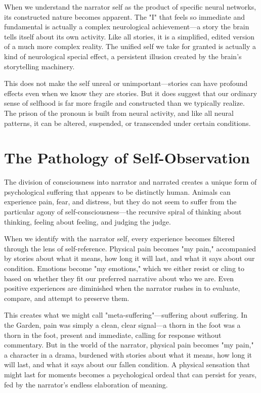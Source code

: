 When we understand the narrator self as the product of specific neural networks, its constructed nature becomes apparent. The "I" that feels so immediate and fundamental is actually a complex neurological achievement—a story the brain tells itself about its own activity. Like all stories, it is a simplified, edited version of a much more complex reality. The unified self we take for granted is actually a kind of neurological special effect, a persistent illusion created by the brain's storytelling machinery.

This does not make the self unreal or unimportant—stories can have profound effects even when we know they are stories. But it does suggest that our ordinary sense of selfhood is far more fragile and constructed than we typically realize. The prison of the pronoun is built from neural activity, and like all neural patterns, it can be altered, suspended, or transcended under certain conditions.

\section{The Pathology of Self-Observation}

The division of consciousness into narrator and narrated creates a unique form of psychological suffering that appears to be distinctly human. Animals can experience pain, fear, and distress, but they do not seem to suffer from the particular agony of self-consciousness—the recursive spiral of thinking about thinking, feeling about feeling, and judging the judge.

When we identify with the narrator self, every experience becomes filtered through the lens of self-reference. Physical pain becomes "my pain," accompanied by stories about what it means, how long it will last, and what it says about our condition. Emotions become "my emotions," which we either resist or cling to based on whether they fit our preferred narrative about who we are. Even positive experiences are diminished when the narrator rushes in to evaluate, compare, and attempt to preserve them.

This creates what we might call "meta-suffering"—suffering about suffering. In the Garden, pain was simply a clean, clear signal—a thorn in the foot was a thorn in the foot, present and immediate, calling for response without commentary. But in the world of the narrator, physical pain becomes "my pain," a character in a drama, burdened with stories about what it means, how long it will last, and what it says about our fallen condition. A physical sensation that might last for moments becomes a psychological ordeal that can persist for years, fed by the narrator's endless elaboration of meaning.

